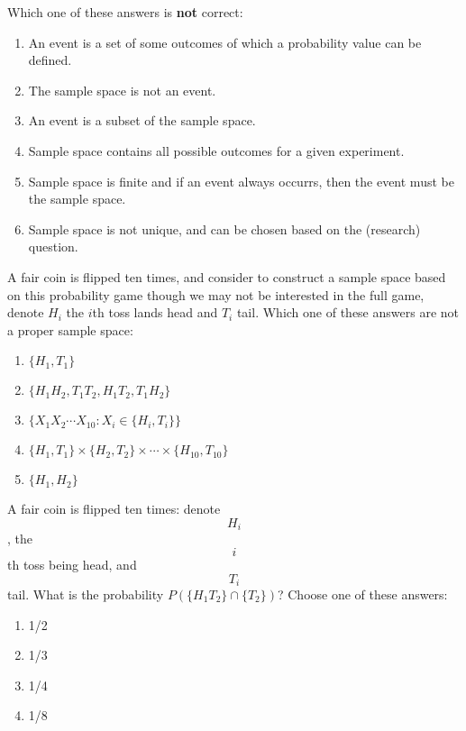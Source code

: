 \documentclass[poll_tutorial_format]{subfiles}
\begin{document}
	\begin{exercise}
	Which one of these answers is \textbf{not} correct: 
	\begin{enumerate}
		\item An event is a set of some outcomes of which a probability value can be defined.
		\item The sample space is not an event.
		\item An event is a subset of the sample space.
		\item Sample space contains all possible outcomes for a given experiment.
		\item Sample space is finite and if  an event always occurrs, then the event must be the sample space.
		\item Sample space is not unique, and can be chosen based on the (research) question.
	\end{enumerate}
\end{exercise}

	
	\begin{exercise}
		A fair coin is flipped ten times, and  consider to construct a sample space based on this probability game though we may not be interested in the full game, denote $H_i$ the $i$th toss lands head and $T_i$ tail. 
		Which one of these answers are not a proper sample space:
		\begin{enumerate}
			\item $\{H_1, T_1\}$
			\item $\{H_1H_2, T_1T_2, H_1T_2, T_1H_2\}$
			\item $\{X_1X_2\cdots X_{10}: X_i \in \{H_i,T_i\}\}$
			\item $\{H_1, T_1\}\times\{H_2, T_2\}\times  \cdots \times \{H_{10}, T_{10}\}$
			\item $\{H_1, H_2\}$
		\end{enumerate}
	\end{exercise}
	
	\begin{exercise}
		A fair coin is flipped ten times: denote $$H_i$$, the $$i$$th toss being head, and $$T_i$$ tail. What is the probability $P( \{H_1T_2\} \cap \{T_2\} )$?
		Choose one of these answers:
		\begin{enumerate}
			\item 1/2
			\item 1/3
			\item 1/4
			\item 1/8
		\end{enumerate}
	\end{exercise}
\end{document}
